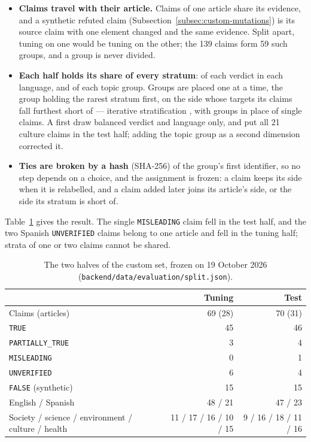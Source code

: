 \begin{itemize}
    \item \textbf{Claims travel with their article.} Claims of one
    article share its evidence, and a synthetic refuted claim
    (Subsection~\ref{subsec:custom-mutations}) is its source claim with
    one element changed and the same evidence. Split apart, tuning on
    one would be tuning on the other; the 139 claims form 59 such
    groups, and a group is never divided.
    \item \textbf{Each half holds its share of every stratum}: of each
    verdict in each language, and of each topic group. Groups are placed
    one at a time, the group holding the rarest stratum first, on the
    side whose targets its claims fall furthest short of --- iterative
    stratification \cite{sechidis2011stratification}, with groups in
    place of single claims. A first draw balanced verdict and language
    only, and put all 21 culture claims in the test half; adding the
    topic group as a second dimension corrected it.
    \item \textbf{Ties are broken by a hash} (SHA-256) of the group's
    first identifier, so no step depends on a choice, and the
    assignment is frozen: a claim keeps its side when it is relabelled,
    and a claim added later joins its article's side, or the side its
    stratum is short of.
\end{itemize}

Table~\ref{tab:custom-split} gives the result. The single
\texttt{MISLEADING} claim fell in the test half, and the two Spanish
\texttt{UNVERIFIED} claims belong to one article and fell in the
tuning half; strata of one or two claims cannot be shared.

\begin{table}[ht]
\centering
\small
\begin{tabular}{@{}lrr@{}}
\toprule
& \textbf{Tuning} & \textbf{Test} \\
\midrule
Claims (articles)        & 69 (28) & 70 (31) \\
\texttt{TRUE}            & 45 & 46 \\
\texttt{PARTIALLY\_TRUE} &  3 &  4 \\
\texttt{MISLEADING}      &  0 &  1 \\
\texttt{UNVERIFIED}      &  6 &  4 \\
\texttt{FALSE} (synthetic) & 15 & 15 \\
\midrule
English / Spanish        & 48 / 21 & 47 / 23 \\
Society / science / environment / culture / health & 11 / 17 / 16 / 10 / 15 & 9 / 16 / 18 / 11 / 16 \\
\bottomrule
\end{tabular}
\caption[The two halves of the custom set]{The two halves of the custom set, frozen on 19 October 2026
(\texttt{backend/data/evaluation/split.json}).}
\label{tab:custom-split}
\end{table}

